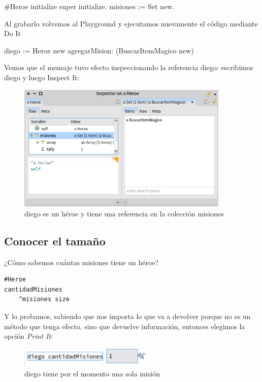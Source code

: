 \documentclass[a4paper,12pt]{book}
\begin{document}
\begin{code}
#Heroe
initialize
	super initialize.
	misiones := Set new.
\end{code}


Al grabarlo volvemos al Playground y ejecutamos nuevamente el código mediante Do It

\begin{code}
diego := Heroe new
  agregarMision: (BuscarItemMagico new)
\end{code}


Vemos que el mensaje tuvo efecto inspeccionando la referencia diego: escribimos diego y luego Inspect It:

\begin{figure}[h!]
    \centering	
    \includegraphics[width=0.9\textwidth]{images/14_coleccion_inicial.png}
    \caption{diego es un héroe y tiene una referencia en la colección misiones}
\end{figure}
\FloatBarrier


\subsection{Conocer el tamaño}
¿Cómo sabemos cuántas misiones tiene un héroe?

\begin{lstlisting}[frame=single]
#Heroe
cantidadMisiones
    ^misiones size
\end{lstlisting}
Y lo probamos, sabiendo que nos importa lo que va a devolver porque no es un método que tenga efecto, sino que
devuelve información, entonces elegimos la opción \textit{Print It}:

\begin{figure}[h!]
    \centering	
    \includegraphics[width=0.6\textwidth]{images/15_diego_cantidadMisiones.png}
    \caption{diego tiene por el momento una sola misión}
\end{figure}
\FloatBarrier
\end{document}
